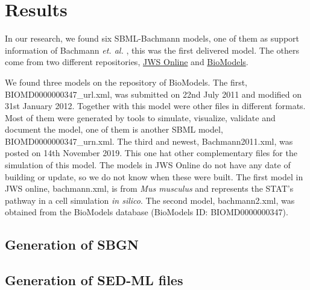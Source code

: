 \section*{Results} \label{resuslt}
In our research, we found six SBML-Bachmann models, one of them as support information of Bachmann \textit{et. al.} \cite{bachmannmodel}, this was the first delivered model. The others come from two different repositories, \hyperlink{https://www.systemsmedicine.net/posts/jws-online-biological-systems-modelling}{JWS Online} and \hyperlink{https://www.ebi.ac.uk/biomodels/}{BioModels}.

We found three models on the repository of BioModels. The first, \textsf{BIOMD0000000347\_url.xml}, was submitted on 22nd July 2011 and modified on 31st January 2012. Together with this model were other files in different formats. Most of them were generated by tools to simulate, visualize, validate and document the model, one of them is another SBML model, \textsf{BIOMD0000000347\_urn.xml}. The third and newest, Bachmann2011.xml, was posted on 14th November 2019. This one hat other complementary files for the simulation of this model. The models in JWS Online do not have any date of building or update, so we do not know when these were built. The first model in JWS online, bachmann.xml, is from \textit{Mus musculus} and represents the STAT's pathway in a cell simulation \textit{in silico}. The second model, \textsf{bachmann2.xml}, was obtained from the BioModels database (BioModels ID: BIOMD0000000347).

\subsection*{Generation of SBGN}

\subsection*{Generation of SED-ML files}
